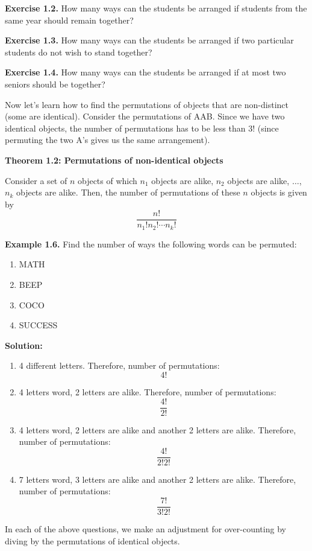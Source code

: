 \documentclass[
  12pt,
]{krantzNoCorner}
\providecommand{\tightlist}{%
  \setlength{\itemsep}{0pt}\setlength{\parskip}{0pt}}
\begin{document}
\textbf{Exercise 1.2.} How many ways can the students be arranged if students
from the same year should remain together?

\textbf{Exercise 1.3.} How many ways can the students be arranged if two
particular students do not wish to stand together?

\textbf{Exercise 1.4.} How many ways can the students be arranged if at most
two seniors should be together?

Now let's learn how to find the permutations of objects that are
non-distinct (some are identical). Consider the permutations of AAB.
Since we have two identical objects, the number of permutations has to
be less than \(3!\) (since permuting the two A's gives us the same
arrangement).

\textbf{Theorem 1.2: Permutations of non-identical objects}

Consider a set of \(n\) objects of which \(n_1\) objects are alike, \(n_2\)
objects are alike, \(\dots\), \(n_k\) objects are alike. Then, the number of
permutations of these \(n\) objects is given by
\[\frac{n!}{n_1!n_2!\cdots n_k!}\]

\textbf{Example 1.6.} Find the number of ways the following words can be
permuted:

\begin{enumerate}
\def\labelenumi{\arabic{enumi}.}
\tightlist
\item
  MATH
\item
  BEEP
\item
  COCO
\item
  SUCCESS
\end{enumerate}

\textbf{Solution:}

\begin{enumerate}
\def\labelenumi{\arabic{enumi}.}
\tightlist
\item
  4 different letters. Therefore, number of permutations: \[4!\]
\item
  4 letters word, 2 letters are alike. Therefore, number of
  permutations: \[\frac{4!}{2!}\]
\item
  4 letters word, 2 letters are alike and another 2 letters are alike.
  Therefore, number of permutations: \[\frac{4!}{2!2!}\]
\item
  7 letters word, 3 letters are alike and another 2 letters are alike.
  Therefore, number of permutations: \[\frac{7!}{3!2!}\]
\end{enumerate}

In each of the above questions, we make an adjustment for over-counting
by diving by the permutations of identical objects.
\end{document}
